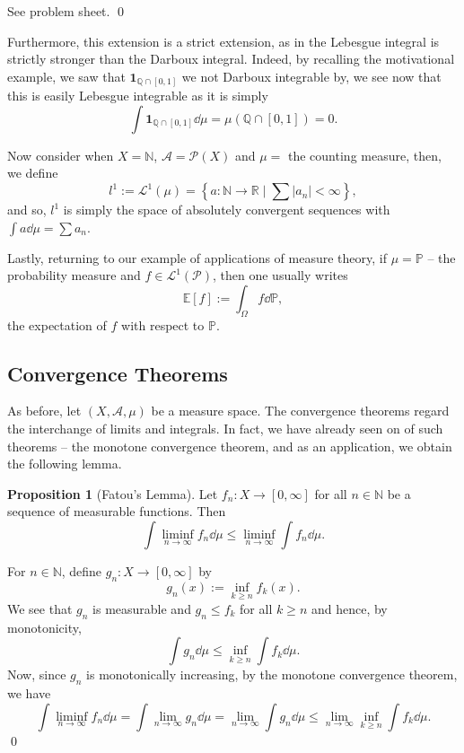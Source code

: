 \documentclass[
]{article}
\theoremstyle{definition}
\newtheorem{prop}{Proposition}
\theoremstyle{definition}
\begin{document}
See problem sheet. \qed

Furthermore, this extension is a strict extension, as in the Lebesgue
integral is strictly stronger than the Darboux integral. Indeed, by
recalling the motivational example, we saw that
\(\mathbf{1}_{\mathbb{Q} \cap [0, 1]}\) we not Darboux integrable by, we
see now that this is easily Lebesgue integrable as it is simply
\[\int \mathbf{1}_{\mathbb{Q} \cap [0, 1]} \dd \mu = \mu(\mathbb{Q} \cap [0, 1]) = 0.\]

Now consider when \(X = \mathbb{N}\), \(\mathcal{A} = \mathcal{P}(X)\)
and \(\mu =\) the counting measure, then, we define
\[l^1 := \mathcal{L}^1(\mu) = \left\{ a : \mathbb{N} \to \mathbb{R} \mid
 \sum |a_n| < \infty\right\},\] and so, \(l^1\) is simply the space of
absolutely convergent sequences with \(\int a \dd \mu = \sum a_n\).

Lastly, returning to our example of applications of measure theory, if
\(\mu = \mathbb{P}\) -- the probability measure and
\(f \in \mathcal{L}^1(\mathcal{P})\), then one usually writes
\[\mathbb{E}[f] := \int_\Omega f \dd \mathbb{P},\] the expectation of
\(f\) with respect to \(\mathbb{P}\).

\hypertarget{convergence-theorems}{%
\subsection{Convergence Theorems}\label{convergence-theorems}}

As before, let \((X, \mathcal{A}, \mu)\) be a measure space. The
convergence theorems regard the interchange of limits and integrals. In
fact, we have already seen on of such theorems -- the monotone
convergence theorem, and as an application, we obtain the following
lemma.

\begin{prop}[Fatou's Lemma]
  Let \(f_n : X \to [0, \infty]\) for all \(n \in \mathbb{N}\) be a sequence 
  of measurable functions. Then 
  \[\int \liminf_{n \to \infty} f_n \dd \mu \le \liminf_{n \to \infty} \int f_n \dd \mu.\]
\end{prop}
\proof

For \(n \in \mathbb{N}\), define \(g_n : X \to [0, \infty]\) by
\[g_n(x) := \inf_{k \ge n} f_k(x).\] We see that \(g_n\) is measurable
and \(g_n \le f_k\) for all \(k \ge n\) and hence, by monotonicity,
\[\int g_n \dd \mu \le \inf_{k \ge n} \int f_k \dd \mu.\] Now, since
\(g_n\) is monotonically increasing, by the monotone convergence
theorem, we have \[\int \liminf_{n \to \infty} f_n \dd \mu 
    = \int \lim_{n \to \infty} g_n \dd \mu 
    = \lim_{n \to \infty} \int g_n \dd \mu 
    \le \lim_{n \to \infty} \inf_{k \ge n} \int f_k \dd \mu.\] \qed
\end{document}
